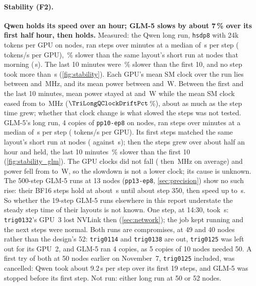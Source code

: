 \paragraph{Stability (F2).} \textbf{Qwen holds its speed over an hour; GLM-5 slows by about 7\,\% over its first half hour, then holds.} Measured: the Qwen long run, \texttt{hsdp8} with 24k tokens per GPU on \TriLongQNodes{} nodes, ran \TriLongQSteps{} steps over \TriLongQMin{} minutes at a median of \TriLongQStep\,s per step (\TriLongQTok{} tokens/s per GPU), \TriLongQVsRefPct\,\% slower than the same layout's short run at \TriLongQRefNodes{} nodes that morning (\TriLongQRefStep\,s). The last 10 minutes were \TriLongQDriftPct\,\% slower than the first 10, and no step took more than \TriLongQMax\,s (\cref{fig:stability}). Each GPU's mean SM clock over the run lies between \TriLongQClockLo{} and \TriLongQClockHi\,MHz, and its mean power between \TriLongQWattLo{} and \TriLongQWattHi\,W. Between the first and the last 10 minutes, mean power stayed at \TriLongQWattFirst{} and \TriLongQWattLast\,W while the mean SM clock eased from \TriLongQClockFirst{} to \TriLongQClockLast\,MHz ($\TriLongQClockDriftPct$\,\%), about as much as the step time grew; whether that clock change is what slowed the steps was not tested. GLM-5's long run, 4 copies of \texttt{pp10-ep8} on \TriLongGNodes{} nodes, ran \TriLongGSteps{} steps over \TriLongGMin{} minutes at a median of \TriLongGStep\,s per step (\TriLongGTok{} tokens/s per GPU). Its first \TriLongGRefSteps{} steps matched the same layout's short run at \TriLongGRefNodes{} nodes (\TriLongGHead{} against \TriLongGRefStep\,s); then the steps grew over about half an hour and held, the last 10 minutes \TriLongGDriftPct\,\% slower than the first 10 (\cref{fig:stability_glm}). The GPU clocks did not fall (\TriLongGClockFirst{} then \TriLongGClockLast\,MHz on average) and power fell from \TriLongGWattFirst{} to \TriLongGWattLast\,W, so the slowdown is not a lower clock; its cause is unknown. The 500-step GLM-5 runs at 13 nodes (\texttt{pp13-ep8}, \cref{sec:precision}) show no such rise: their BF16 steps hold at about \TriGlmLongBfMid\,s until about step 350, then speed up to \TriGlmLongBfEnd\,s. So whether the 19-step GLM-5 runs elsewhere in this report understate the steady step time of their layouts is not known. One step, at 14:30, took \TriLongGMax\,s: \texttt{trig0132}'s GPU~3 lost NVLink then (\cref{sec:network}); the job kept running and the next steps were normal. Both runs are compromises, at 49 and 40 nodes rather than the design's 52: \texttt{trig0114} and \texttt{trig0138} are out, \texttt{trig0125} was left out for its GPU~2, and GLM-5 ran 4 copies, as 5 copies of 10 nodes needed 50. A first try of both at 50 nodes earlier on November~7, \texttt{trig0125} included, was cancelled: Qwen took about 9.2\,s per step over its first 19 steps, and GLM-5 was stopped before its first step. Not run: either long run at 50 or 52 nodes.

